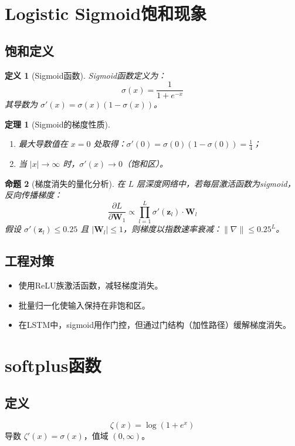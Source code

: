\documentclass[UTF8, 10pt]{ctexart}
\newtheorem{theorem}{定理}[section]
\newtheorem{definition}{定义}[section]
\newtheorem{proposition}[theorem]{命题}
\begin{document}
\section{Logistic Sigmoid饱和现象}
\subsection{饱和定义}
\begin{definition}[Sigmoid函数]
Sigmoid函数定义为：
\[
\sigma(x) = \frac{1}{1 + e^{-x}}
\]
其导数为 $\sigma'(x) = \sigma(x)(1 - \sigma(x))$。
\end{definition}

\begin{theorem}[Sigmoid的梯度性质]
\begin{enumerate}
    \item 最大导数值在 $x = 0$ 处取得：$\sigma'(0) = \sigma(0)(1 - \sigma(0)) = \frac{1}{4}$；
    \item 当 $|x| \to \infty$ 时，$\sigma'(x) \to 0$（饱和区）。
\end{enumerate}
\end{theorem}

\begin{proposition}[梯度消失的量化分析]
在 $L$ 层深度网络中，若每层激活函数为sigmoid，反向传播梯度：
\[
\frac{\partial L}{\partial \bm{W}_1} \propto \prod_{l=1}^{L} \sigma'(\bm{z}_l) \cdot \bm{W}_l
\]
假设 $\sigma'(\bm{z}_l) \le 0.25$ 且 $|\bm{W}_l| \le 1$，则梯度以指数速率衰减：$\|\nabla\| \le 0.25^L$。
\end{proposition}

\subsection{工程对策}
\begin{itemize}
    \item 使用ReLU族激活函数，减轻梯度消失。
    \item 批量归一化使输入保持在非饱和区。
    \item 在LSTM中，sigmoid用作门控，但通过门结构（加性路径）缓解梯度消失。
\end{itemize}

\section{softplus函数}
\subsection{定义}
\[
\zeta(x) = \log(1 + e^x)
\]
导数 $\zeta'(x) = \sigma(x)$，值域 $(0,\infty)$。
\end{document}
